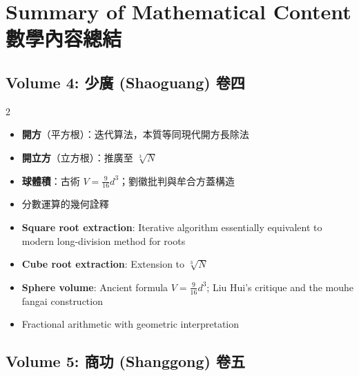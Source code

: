 \documentclass[10pt,a4paper]{article}
\begin{document}
\newpage

\section{Summary of Mathematical Content 數學內容總結}

\subsection*{Volume 4: 少廣 (Shaoguang) 卷四}

\begin{paracol}{2}
\begin{leftcolumn*}
\begin{itemize}[leftmargin=1.2em,topsep=1pt,itemsep=1pt]
  \item \textbf{開方}（平方根）：迭代算法，本質等同現代開方長除法
  \item \textbf{開立方}（立方根）：推廣至 $\sqrt[3]{N}$
  \item \textbf{球體積}：古術 $V = \frac{9}{16}d^3$；劉徽批判與牟合方蓋構造
  \item 分數運算的幾何詮釋
\end{itemize}
\end{leftcolumn*}
\begin{rightcolumn*}
\begin{itemize}[leftmargin=1.2em,topsep=1pt,itemsep=1pt]
  \item \textbf{Square root extraction}: Iterative algorithm essentially equivalent to modern long-division method for roots
  \item \textbf{Cube root extraction}: Extension to $\sqrt[3]{N}$
  \item \textbf{Sphere volume}: Ancient formula $V = \frac{9}{16}d^3$; Liu Hui's critique and the mouhe fangai construction
  \item Fractional arithmetic with geometric interpretation
\end{itemize}
\end{rightcolumn*}
\end{paracol}

\subsection*{Volume 5: 商功 (Shanggong) 卷五}
\end{document}
